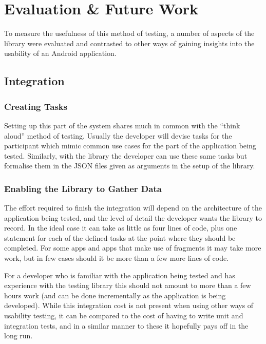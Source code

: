 \chapter{Evaluation \& Future Work}

To measure the usefulness of this method of testing, a number of
aspects of the library were evaluated and contrasted to other ways of
gaining insights into the usability of an Android application.

\section{Integration}

\subsection{Creating Tasks}

Setting up this part of the system shares much in common with the
``think aloud'' method of testing.  Usually the developer will
devise tasks for the participant which mimic common use cases for
the part of the application being tested. Similarly, with the library
the developer can use these same tasks but formalise them in the
JSON files given as arguments in the setup of the library.

\subsection{Enabling the Library to Gather Data}

The effort required to finish the integration will depend on the
architecture of the application being tested, and the level of
detail the developer wants the library to record. In the ideal case
it can take as little as four
lines of code, plus one statement for each of the defined tasks at
the point where they should be completed. For some apps and apps
that make use of fragments it may take more work, but in few cases
should it be more than a few more lines of code.

For a developer who is familiar with the application being tested
and has experience with the testing library this should not amount
to more than a few hours work (and can be done incrementally as the
application is being developed). While this integration cost is not
present when using other ways of usability testing, it can be
compared to the cost of having to write unit and integration tests,
and in a similar manner to these it hopefully pays off in the long
run.

